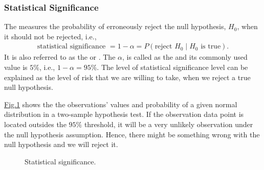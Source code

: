\documentclass[letterpaper,11pt,english]{sphinxmanual}
\begin{document}
\subsubsection{Statistical Significance}
\label{\detokenize{chapter_appendix_math/statistics:statistical-significance}}
The  measures the probability of erroneously
reject the null hypothesis, \(H_0\), when it should not be rejected,
i.e.,
\begin{equation}\label{equation:chapter_appendix_math/statistics:chapter_appendix_math/statistics:1}
\begin{split}\text{statistical significance }= 1 - \alpha = P(\text{reject } H_0 \mid H_0 \text{ is true} ).\end{split}
\end{equation}
It is also referred to as the  or . The
\(\alpha\), is called as the  and its commonly
used value is \(5\%\), i.e., \(1-\alpha = 95\%\). The level of
statistical significance level can be explained as the level of risk
that we are willing to take, when we reject a true null hypothesis.

\hyperref[\detokenize{chapter_appendix_math/statistics:fig-statistical-significance}]{Fig.\@ \ref{\detokenize{chapter_appendix_math/statistics:fig-statistical-significance}}} shows the the observations’
values and probability of a given normal distribution in a two-sample
hypothesis test. If the observation data point is located outsides the
\(95\%\) threshold, it will be a very unlikely observation under the
null hypothesis assumption. Hence, there might be something wrong with
the null hypothesis and we will reject it.

\begin{figure}[H]
\centering
\capstart

\noindent{}
\caption{Statistical significance.}\label{\detokenize{chapter_appendix_math/statistics:id3}}\label{\detokenize{chapter_appendix_math/statistics:fig-statistical-significance}}\end{figure}
\end{document}
